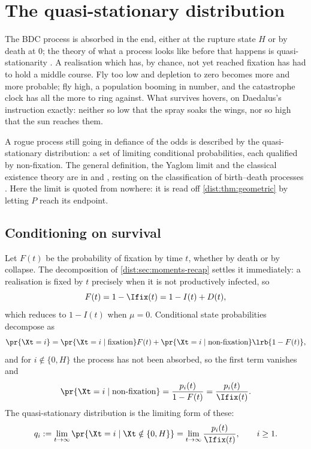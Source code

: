 \section{The quasi-stationary distribution}
\label{dist:sec:qsd}

The BDC process is absorbed in the end, either at the rupture state $H$ or by
death at $0$; the theory of what a process looks like before that happens is
quasi-stationarity \cite{van2011quasi}. A realisation which has, by chance,
not yet reached fixation has had to hold a middle course. Fly too low and
depletion to zero becomes more and more probable; fly high, a population
booming in number, and the catastrophe clock has all the more to ring
against. What survives hovers, on Daedalus's instruction exactly: neither so
low that the spray soaks the wings, nor so high that the sun reaches them.

A rogue process still going in defiance of the odds is described by the
quasi-stationary distribution: a set of limiting conditional probabilities,
each qualified by non-fixation. The general definition, the Yaglom limit and
the classical existence theory are in
 and
, resting on the
classification of birth--death
processes \cite{karlin1957classification}. Here the limit is quoted from
nowhere: it is read off \cref{dist:thm:geometric} by letting $P$ reach its
endpoint.

\subsection{Conditioning on survival}
\label{dist:sec:conditioning}

Let $F(t)$ be the probability of fixation by time $t$, whether by death or by
collapse. The decomposition of \cref{dist:sec:moments-recap} settles it
immediately: a realisation is fixed by $t$ precisely when it is not
productively infected, so
\begin{equation}
F(t)=1-\Ifix(t)=1-I(t)+D(t),
\label{dist:eq:fixprob}
\end{equation}
which reduces to $1-I(t)$ when $\mu=0$. Conditional state probabilities
decompose as
\[
\pr{\Xt=i}=\pr{\Xt=i\mid\text{fixation}}F(t)
+\pr{\Xt=i\mid\text{non-fixation}}\lrb{1-F(t)},
\]
and for $i\notin\{0,H\}$ the process has not been absorbed, so the first term
vanishes and
\begin{equation}
\pr{\Xt=i\mid \text{non-fixation}}
=\frac{p_i(t)}{1-F(t)}=\frac{p_i(t)}{\Ifix(t)}.
\label{dist:eq:condp}
\end{equation}
The quasi-stationary distribution is the limiting form of these:
\begin{equation}
q_i:=\lim_{t\to\infty}\pr{\Xt=i\mid\Xt\notin\{0,H\}}
=\lim_{t\to\infty}\frac{p_i(t)}{\Ifix(t)},\qquad i\ge1.
\label{dist:eq:qsddef}
\end{equation}


